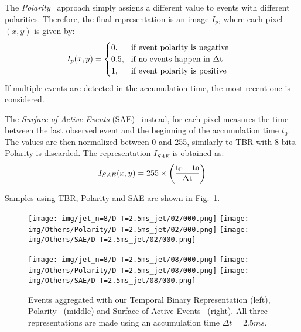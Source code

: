 \documentclass[a4paper,conference]{IEEEtran}
\begin{document}
The \textit{Polarity}~\cite{nguyen2019real} approach simply assigns a different value to events with different polarities. Therefore, the final representation is an image $I_p$, where each pixel $(x,y)$ is given by:
\begin{equation}
I_{p}(x,y) = 
\begin{cases}
0, \hspace{15px}  \text{if event polarity is negative}\\
0.5, \hspace{7px} \text{if no events happen in $\Delta$t}\\
1, \hspace{15px} \text{if event polarity is positive}
\end{cases}
\end{equation}
If multiple events are detected in the accumulation time, the most recent one is considered.

The \textit{Surface of Active Events} (SAE)~\cite{mueggler2017fast} instead, for each pixel measures the time between the last observed event and the beginning of the accumulation time $t_0$. The values are then normalized between 0 and 255, similarly to TBR with 8 bits. Polarity is discarded. The representation $I_{SAE}$ is obtained as:
\begin{equation}
I_{SAE}(x, y) = 255 \times \left(\frac{\text{t\scriptsize{p}} - \text{t\scriptsize{0}}}{\text{$\Delta$t}}\right)
\end{equation}

Samples using TBR, Polarity and SAE are shown in Fig.~\ref{fig:accumulation_strategies}.

\begin{figure}[!t]
	\centering
	\texttt{[image: img/jet\_n=8/D-T=2.5ms\_jet/02/000.png]}
	\texttt{[image: img/Others/Polarity/D-T=2.5ms\_jet/02/000.png]}
	\texttt{[image: img/Others/SAE/D-T=2.5ms\_jet/02/000.png]} \\ \medskip
	
	\texttt{[image: img/jet\_n=8/D-T=2.5ms\_jet/08/000.png]}
	\texttt{[image: img/Others/Polarity/D-T=2.5ms\_jet/08/000.png]}
	\texttt{[image: img/Others/SAE/D-T=2.5ms\_jet/08/000.png]}
	
	\caption{Events aggregated with our Temporal Binary Representation (left), Polarity~\cite{nguyen2019real} (middle) and Surface of Active Events~\cite{mueggler2017fast} (right). All three representations are made using an accumulation time $\Delta t=2.5 ms$.}
	\label{fig:accumulation_strategies}
\end{figure}
\end{document}

